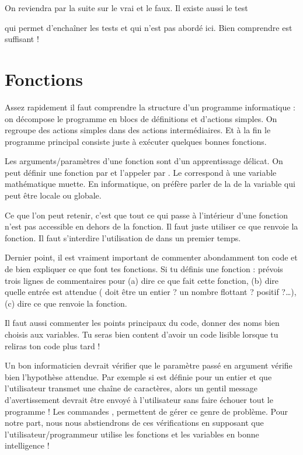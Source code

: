 \documentclass[11pt,class=report,crop=false]{standalone}
\begin{document}
On reviendra par la suite sur le \og{}vrai\fg{} et le \og{}faux\fg{}.
Il existe aussi le test\\ 
\centerline{}
qui permet d'enchaîner les tests et qui n'est pas abordé ici. 
Bien comprendre  est suffisant ! 


\section{Fonctions}

Assez rapidement il faut comprendre la structure d'un programme informatique : on décompose le programme en blocs de définitions et d'actions simples. On regroupe des actions simples dans des actions intermédiaires. Et à la fin le programme principal consiste juste à exécuter quelques bonnes fonctions.

Les arguments/paramètres d'une fonction sont d'un apprentissage délicat.
On peut définir une fonction par  et l'appeler par
. Le  correspond à une variable mathématique muette. 
En informatique, on préfère parler de la  de la variable qui peut être locale ou globale.

Ce que l'on peut retenir, c'est que tout ce qui passe à l'intérieur d'une fonction n'est pas accessible en dehors de la fonction. Il faut juste utiliser ce que renvoie la fonction.
Il faut s’interdire l'utilisation de  dans un premier temps.

Dernier point, il est vraiment important de commenter abondamment ton code et de bien expliquer ce que font tes fonctions. Si tu définis une fonction  : prévois trois lignes de commentaires pour (a) dire ce que fait cette fonction, (b) dire quelle entrée est attendue ( doit être un entier ? un nombre flottant ? positif ?\ldots), (c) dire ce que renvoie la fonction.

Il faut aussi commenter les points principaux du code, donner des noms bien choisis aux variables. Tu seras bien content d'avoir un code lisible lorsque tu reliras ton code plus tard !

Un bon informaticien devrait vérifier que le paramètre passé en argument vérifie bien l'hypothèse attendue. Par exemple si  est définie pour un entier  et que l'utilisateur transmet une chaîne de caractères, alors un gentil message d'avertissement devrait être envoyé à l'utilisateur sans faire échouer tout le programme !
Les commandes ,  permettent de gérer ce genre de problème. 
Pour notre part, nous nous abstiendrons de ces vérifications en supposant que l'utilisateur/programmeur utilise les fonctions et les variables en bonne intelligence !
\end{document}
